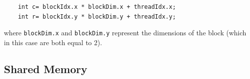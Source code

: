 \begin{center}
\begin{verbatim}
	int c= blockIdx.x * blockDim.x + threadIdx.x;
	int r= blockIdx.y * blockDim.y + threadIdx.y;
\end{verbatim}
\end{center}

where \texttt{blockDim.x} and \texttt{blockDim.y} represent the dimensions of the block (which in this case are both equal to 2).

	\subsection{Shared Memory}
	
	
